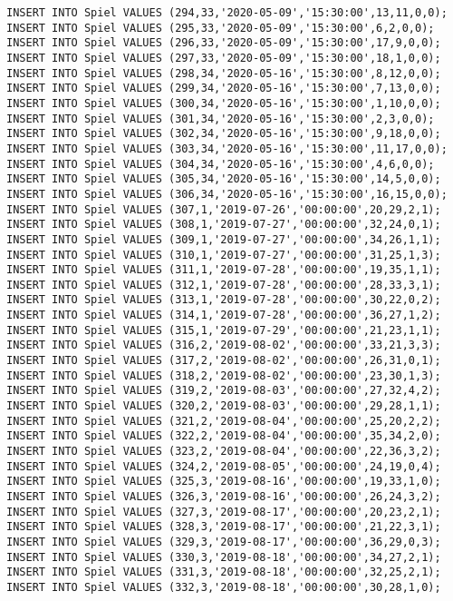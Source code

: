 \documentclass{bschlangaul-aufgabe}
\begin{document}
\begin{verbatim}
INSERT INTO Spiel VALUES (294,33,'2020-05-09','15:30:00',13,11,0,0);
INSERT INTO Spiel VALUES (295,33,'2020-05-09','15:30:00',6,2,0,0);
INSERT INTO Spiel VALUES (296,33,'2020-05-09','15:30:00',17,9,0,0);
INSERT INTO Spiel VALUES (297,33,'2020-05-09','15:30:00',18,1,0,0);
INSERT INTO Spiel VALUES (298,34,'2020-05-16','15:30:00',8,12,0,0);
INSERT INTO Spiel VALUES (299,34,'2020-05-16','15:30:00',7,13,0,0);
INSERT INTO Spiel VALUES (300,34,'2020-05-16','15:30:00',1,10,0,0);
INSERT INTO Spiel VALUES (301,34,'2020-05-16','15:30:00',2,3,0,0);
INSERT INTO Spiel VALUES (302,34,'2020-05-16','15:30:00',9,18,0,0);
INSERT INTO Spiel VALUES (303,34,'2020-05-16','15:30:00',11,17,0,0);
INSERT INTO Spiel VALUES (304,34,'2020-05-16','15:30:00',4,6,0,0);
INSERT INTO Spiel VALUES (305,34,'2020-05-16','15:30:00',14,5,0,0);
INSERT INTO Spiel VALUES (306,34,'2020-05-16','15:30:00',16,15,0,0);
INSERT INTO Spiel VALUES (307,1,'2019-07-26','00:00:00',20,29,2,1);
INSERT INTO Spiel VALUES (308,1,'2019-07-27','00:00:00',32,24,0,1);
INSERT INTO Spiel VALUES (309,1,'2019-07-27','00:00:00',34,26,1,1);
INSERT INTO Spiel VALUES (310,1,'2019-07-27','00:00:00',31,25,1,3);
INSERT INTO Spiel VALUES (311,1,'2019-07-28','00:00:00',19,35,1,1);
INSERT INTO Spiel VALUES (312,1,'2019-07-28','00:00:00',28,33,3,1);
INSERT INTO Spiel VALUES (313,1,'2019-07-28','00:00:00',30,22,0,2);
INSERT INTO Spiel VALUES (314,1,'2019-07-28','00:00:00',36,27,1,2);
INSERT INTO Spiel VALUES (315,1,'2019-07-29','00:00:00',21,23,1,1);
INSERT INTO Spiel VALUES (316,2,'2019-08-02','00:00:00',33,21,3,3);
INSERT INTO Spiel VALUES (317,2,'2019-08-02','00:00:00',26,31,0,1);
INSERT INTO Spiel VALUES (318,2,'2019-08-02','00:00:00',23,30,1,3);
INSERT INTO Spiel VALUES (319,2,'2019-08-03','00:00:00',27,32,4,2);
INSERT INTO Spiel VALUES (320,2,'2019-08-03','00:00:00',29,28,1,1);
INSERT INTO Spiel VALUES (321,2,'2019-08-04','00:00:00',25,20,2,2);
INSERT INTO Spiel VALUES (322,2,'2019-08-04','00:00:00',35,34,2,0);
INSERT INTO Spiel VALUES (323,2,'2019-08-04','00:00:00',22,36,3,2);
INSERT INTO Spiel VALUES (324,2,'2019-08-05','00:00:00',24,19,0,4);
INSERT INTO Spiel VALUES (325,3,'2019-08-16','00:00:00',19,33,1,0);
INSERT INTO Spiel VALUES (326,3,'2019-08-16','00:00:00',26,24,3,2);
INSERT INTO Spiel VALUES (327,3,'2019-08-17','00:00:00',20,23,2,1);
INSERT INTO Spiel VALUES (328,3,'2019-08-17','00:00:00',21,22,3,1);
INSERT INTO Spiel VALUES (329,3,'2019-08-17','00:00:00',36,29,0,3);
INSERT INTO Spiel VALUES (330,3,'2019-08-18','00:00:00',34,27,2,1);
INSERT INTO Spiel VALUES (331,3,'2019-08-18','00:00:00',32,25,2,1);
INSERT INTO Spiel VALUES (332,3,'2019-08-18','00:00:00',30,28,1,0);

\end{verbatim}
\end{document}
